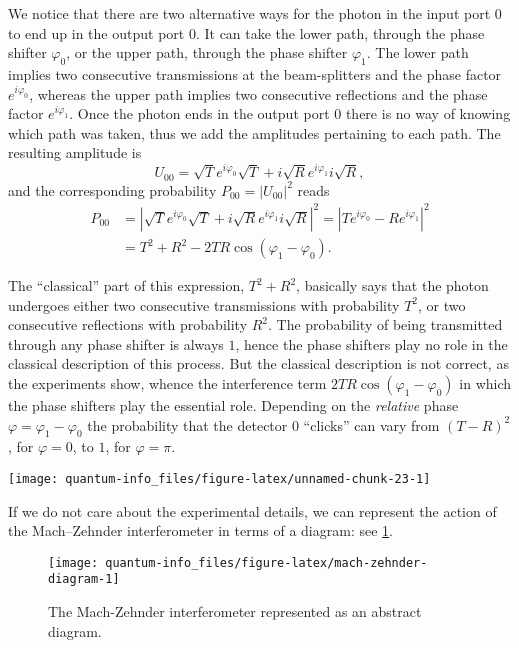\documentclass[fleqn]{article}
\begin{document}
We notice that there are two alternative ways for the photon in the input port \(0\) to end up in the output port \(0\).
It can take the lower path, through the phase shifter \(\varphi_0\), or the upper path, through the phase shifter \(\varphi_1\).
The lower path implies two consecutive transmissions at the beam-splitters and the phase factor \(e^{i\varphi_0}\), whereas the upper path implies two consecutive reflections and the phase factor \(e^{i\varphi_1}\).
Once the photon ends in the output port \(0\) there is no way of knowing which path was taken, thus we add the amplitudes pertaining to each path.
The resulting amplitude is
\[
  U_{00}
  = \sqrt{T} e^{i\varphi_0} \sqrt{T}
  + i\sqrt{R} e^{i\varphi_1} i \sqrt{R},
\]
and the corresponding probability \(P_{00}=|U_{00}|^2\) reads
\[
  \begin{aligned}
    P_{00}
    & = \left\vert
          \sqrt{T}e^{i\varphi_0}\sqrt{T} + i\sqrt{R}e^{i\varphi_1}i\sqrt{R}
        \right\vert^2
      = \left\vert
          Te^{i\varphi_0} - Re^{i\varphi_1}
        \right\vert^2
  \\& = T^2 + R^2
        - 2TR\cos(\varphi_1-\varphi_0).
  \end{aligned}
\]

The ``classical'' part of this expression, \(T^2+R^2\), basically says that the photon undergoes either two consecutive transmissions with probability \(T^2\), or two consecutive reflections with probability \(R^2\).
The probability of being transmitted through any phase shifter is always \(1\), hence the phase shifters play no role in the classical description of this process.
But the classical description is not correct, as the experiments show, whence the interference term \(2TR\cos(\varphi_1-\varphi_0)\) in which the phase shifters play the essential role.
Depending on the \emph{relative} phase \(\varphi=\varphi_1-\varphi_0\) the probability that the detector \(0\) ``clicks'' can vary from \((T-R)^2\), for \(\varphi=0\), to \(1\), for \(\varphi=\pi\).

\begin{center}\texttt{[image: quantum-info\_files/figure-latex/unnamed-chunk-23-1]} \end{center}

If we do not care about the experimental details, we can represent the action of the Mach--Zehnder interferometer in terms of a diagram: see \ref{fig:mach-zehnder-diagram}.

\begin{figure}[H]

{\centering \texttt{[image: quantum-info\_files/figure-latex/mach-zehnder-diagram-1]} 

}

\caption{The Mach-Zehnder interferometer represented as an abstract diagram.}\label{fig:mach-zehnder-diagram}
\end{figure}
\end{document}
